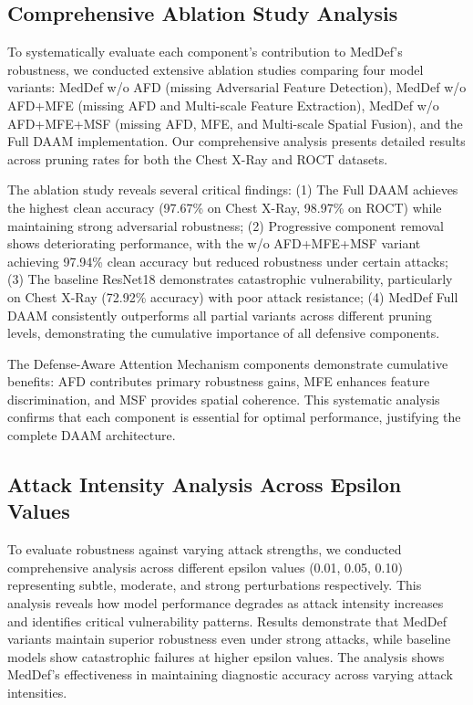 \documentclass[preprint,12pt]{elsarticle}
\begin{document}
\subsection{Comprehensive Ablation Study Analysis}
To systematically evaluate each component's contribution to MedDef's robustness, we conducted extensive ablation studies comparing four model variants: MedDef w/o AFD (missing Adversarial Feature Detection), MedDef w/o AFD+MFE (missing AFD and Multi-scale Feature Extraction), MedDef w/o AFD+MFE+MSF (missing AFD, MFE, and Multi-scale Spatial Fusion), and the Full DAAM implementation. Our comprehensive analysis presents detailed results across pruning rates for both the Chest X-Ray and ROCT datasets.

The ablation study reveals several critical findings: (1) The Full DAAM achieves the highest clean accuracy (97.67\% on Chest X-Ray, 98.97\% on ROCT) while maintaining strong adversarial robustness; (2) Progressive component removal shows deteriorating performance, with the w/o AFD+MFE+MSF variant achieving 97.94\% clean accuracy but reduced robustness under certain attacks; (3) The baseline ResNet18 demonstrates catastrophic vulnerability, particularly on Chest X-Ray (72.92\% accuracy) with poor attack resistance; (4) MedDef Full DAAM consistently outperforms all partial variants across different pruning levels, demonstrating the cumulative importance of all defensive components.

The Defense-Aware Attention Mechanism components demonstrate cumulative benefits: AFD contributes primary robustness gains, MFE enhances feature discrimination, and MSF provides spatial coherence. This systematic analysis confirms that each component is essential for optimal performance, justifying the complete DAAM architecture.

\subsection{Attack Intensity Analysis Across Epsilon Values}
To evaluate robustness against varying attack strengths, we conducted comprehensive analysis across different epsilon values (0.01, 0.05, 0.10) representing subtle, moderate, and strong perturbations respectively. This analysis reveals how model performance degrades as attack intensity increases and identifies critical vulnerability patterns. Results demonstrate that MedDef variants maintain superior robustness even under strong attacks, while baseline models show catastrophic failures at higher epsilon values. The analysis shows MedDef's effectiveness in maintaining diagnostic accuracy across varying attack intensities.
\end{document}

